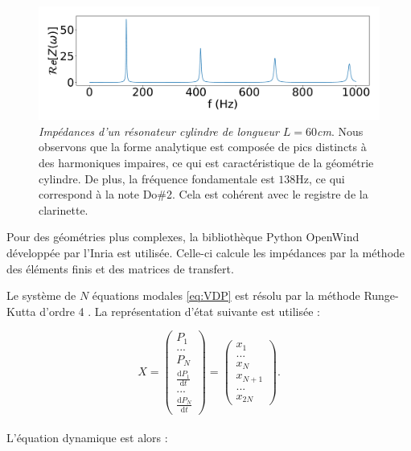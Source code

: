 \begin{figure}
    \centering
    \includegraphics[scale=.2]{img/Z_clari.pdf}
    \caption{\emph{Impédances d'un résonateur cylindre de longueur $L=60$cm}. Nous observons que la forme analytique est composée de pics distincts à des harmoniques impaires, ce qui est caractéristique de la géométrie cylindre. De plus, la fréquence fondamentale est $138$Hz, ce qui correspond à la note Do\#2. Cela est cohérent avec le registre de la clarinette.}
    \label{fig:Z_clarinette}
\end{figure}

Pour des géométries plus complexes, la bibliothèque Python OpenWind \cite{ernoult:hal-04217988} développée par l'Inria est utilisée. Celle-ci calcule les impédances par la méthode des éléments finis et des matrices de transfert.

Le système de $N$ équations modales \eqref{eq:VDP} est résolu par la méthode Runge-Kutta d'ordre 4 \cite{butcher1996history}. La représentation d'état suivante est utilisée :

\begin{equation}
    X=\begin{pmatrix}
        P_1\\...\\P_N\\\frac{\text{d}P_1}{\text{d}t}\\...\\\frac{\text{d}P_N}{\text{d}t}
    \end{pmatrix} = \begin{pmatrix}
    x_1\\...\\x_N\\x_{N+1}\\...\\x_{2N}
    \end{pmatrix}.
\end{equation}\\
L'équation dynamique est alors :

